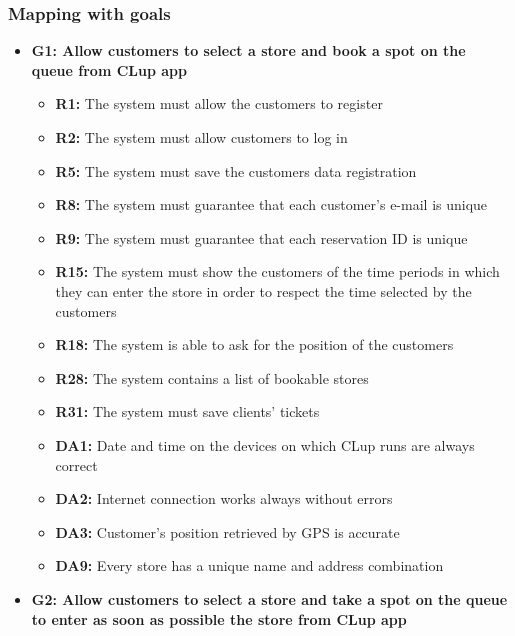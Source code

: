 \documentclass{article}
\begin{document}
		\subsubsection{Mapping with goals}
			
			\begin{itemize}			

			\item {\bfseries G1: Allow customers to select a store and book a spot on the queue from CLup
app}			

				\begin{itemize}
				\item {\bfseries R1:} The system must allow the customers to register
				\item {\bfseries R2:} The system must allow customers to log in
				\item {\bfseries R5:} The system must save the customers data registration
				\item {\bfseries R8:} The system must guarantee that each customer's e-mail is unique
				\item {\bfseries R9:} The system must guarantee that each reservation ID is unique
				\item {\bfseries R15:} The system must show the customers of the time periods in which they can enter the store in order to respect the time selected by the customers
				\item {\bfseries R18:} The system is able to ask for the position of the customers
				\item {\bfseries R28:} The system contains a list of bookable stores
				\item {\bfseries R31:} The system must save clients’ tickets

				\item {\bfseries DA1:} Date and time on the devices on which CLup runs are always correct
				\item {\bfseries DA2:} Internet connection works always without errors
				\item {\bfseries DA3:} Customer’s position retrieved by GPS is accurate
				\item {\bfseries DA9:} Every store has a unique name and address combination
				
				\end{itemize}
		\item {\bfseries G2: Allow customers to select a store and take a spot on the queue to enter as soon as possible the store from CLup app}	


\end{itemize}
\end{document}
